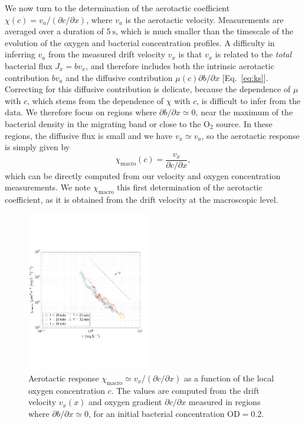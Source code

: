 \documentclass[aps,a4paper,twocolumn,10pt,pre,showpacs]{revtex4-2}
\begin{document}
We now turn to the determination of the aerotactic coefficient $\chi(c) = v_a / (\partial c/\partial x)$, where $v_a$ is the aerotactic velocity. Measurements are averaged over a duration of $\SI{5}{\s}$, which is much smaller than the timescale of the evolution of the oxygen and bacterial concentration profiles. A difficulty in inferring $v_a$ from the measured drift velocity $v_x$ is that $v_x$ is related to the {\it total} bacterial flux $J_x=bv_x$, and therefore includes both the intrinsic aerotactic contribution $bv_a$ and the diffusive contribution $\mu(c) \partial b/\partial x$ [Eq.~\eqref{eq:ks}]. Correcting for this diffusive contribution is delicate, because the dependence of  $\mu$ with $c$, which stems from the dependence of $\chi$ with $c$, is difficult to infer from the data. We therefore focus on regions where $\partial b / \partial x \simeq 0$, near the maximum of the bacterial density in the migrating band or close to the O$_2$ source. In these regions, the diffusive flux is small and we have $v_x \simeq v_a$, so the aerotactic response is simply given by
\begin{equation}
    \chi_\mathrm{macro}(c) = \frac{v_x}{\partial c/\partial x},
\end{equation}
which can be directly computed from our velocity and oxygen concentration measurements.  We note $\chi_\mathrm{macro}$ this first determination of the aerotactic coefficient, as it is obtained from the drift velocity at the macroscopic level.


\begin{figure}[tb]
\includegraphics[trim = 1mm 54mm 8mm 60mm, clip, width=0.48\textwidth, angle=0]{Fig05.pdf}
\caption{Aerotactic response $\chi_{\mathrm{macro}} \simeq v_x/({\partial c}/{\partial x})$  as a function of the local oxygen concentration $c$. The values are 
computed from the drift velocity $v_x(x)$ and oxygen gradient $\partial c/\partial x$ measured in regions where $\partial b/\partial x \simeq 0$, for an initial bacterial concentration $\text{OD}=0.2$.}
\label{fig:figure3}
\end{figure}
\end{document}
